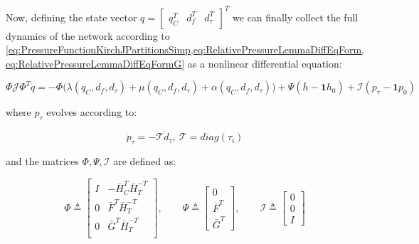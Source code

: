 Now, defining the state vector $q = \begin{bmatrix}q_C^T & d_f^T & d_{\tau}^T \end{bmatrix}^T$ we can finally collect the full dynamics of the network according to \cref{eq:PressureFunctionKirchJPartitionsSimp,eq:RelativePressureLemmaDiffEqForm,eq:RelativePressureLemmaDiffEqFormG} as a nonlinear differential equation:

\begin{equation}\label{eq:NonLinearModelWithTank}
	\Phi\mathcal{J}\Phi^T \dot{q} = -\Phi\Big(\lambda(q_C,d_f,d_{\tau})+\mu(q_C,d_f,d_{\tau})+\alpha(q_C,d_f,d_{\tau})\Big) + \Psi(\bar{h}-\mathbf{1}h_0) + \mathcal{I}(p_{\tau}-\mathbf{1}p_0)
\end{equation}

where $p_{\tau}$ evolves according to:

\begin{equation}\label{eq:TankDynamics}
	\dot{p}_{\tau} = - \mathcal{T} \dot{d}_{\tau}, \ \mathcal{T} = diag(\tau_i)
\end{equation}

and the matrices $\Phi, \Psi, \mathcal{I}$ are defined as:

\begin{equation}\label{eq:NonLinearModelMatrices}
	\Phi \triangleq 
	\begin{bmatrix} 
		I & -\bar{H}_C^T\bar{H}_T^{-T} \\ 0 & \bar{F}^T\bar{H}_T^{-T} \\ 0  & \bar{G}^T\bar{H}_T^{-T} \\ 
	\end{bmatrix}
	, \qquad
	\Psi \triangleq
	\begin{bmatrix}
		0 \\ \bar{F}^T \\ \bar{G}^T
	\end{bmatrix}
	, \qquad
	\mathcal{I} \triangleq
	\begin{bmatrix}
		0 \\ 0 \\ I
	\end{bmatrix}
\end{equation}
